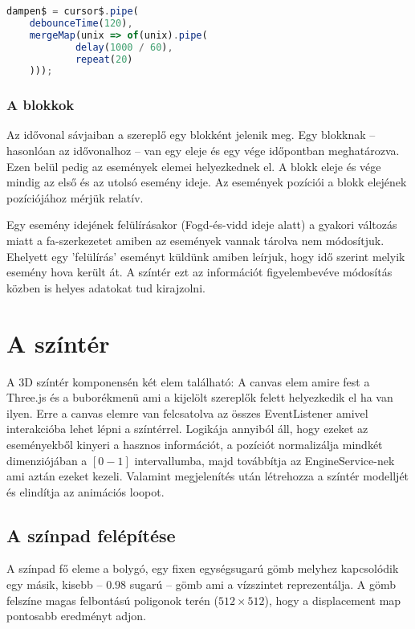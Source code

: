 \begin{lstlisting}[language={JavaScript}]
dampen$ = cursor$.pipe(
	debounceTime(120),
	mergeMap(unix => of(unix).pipe(
			delay(1000 / 60),
			repeat(20)
	)));
\end{lstlisting}

\subsubsection{A blokkok}

Az idővonal sávjaiban a szereplő egy blokként jelenik meg. Egy blokknak -- hasonlóan az idővonalhoz -- van egy eleje és egy vége időpontban meghatározva. Ezen belül pedig az események elemei helyezkednek el. A blokk eleje és vége mindig az első és az utolsó esemény ideje. Az események pozíciói a blokk elejének pozíciójához mérjük relatív.

Egy esemény idejének felülírásakor (Fogd-és-vidd ideje alatt) a gyakori változás miatt a fa-szerkezetet amiben az események vannak tárolva nem módosítjuk. Ehelyett egy 'felülírás' eseményt küldünk amiben leírjuk, hogy idő szerint melyik esemény hova került át. A színtér ezt az információt figyelembevéve módosítás közben is helyes adatokat tud kirajzolni.

\section{A színtér}

A 3D színtér komponensén két elem található: A canvas elem amire fest a Three.js és a buborékmenü ami a kijelölt szereplők felett helyezkedik el ha van ilyen. Erre a canvas elemre van felcsatolva az összes EventListener amivel interakcióba lehet lépni a színtérrel. Logikája annyiból áll, hogy ezeket az eseményekből kinyeri a hasznos információt, a pozíciót normalizálja mindkét dimenziójában a $[0-1]$ intervallumba, majd továbbítja az EngineService-nek ami aztán ezeket kezeli. Valamint megjelenítés után létrehozza a színtér modelljét és elindítja az animációs loopot.

\subsection{A színpad felépítése}

A színpad fő eleme a bolygó, egy fixen egységsugarú gömb melyhez kapcsolódik egy másik, kisebb -- $0.98$ sugarú -- gömb ami a vízszintet reprezentálja. A gömb felszíne magas felbontású poligonok terén ($512×512$), hogy a displacement map \cite{Displacement} pontosabb eredményt adjon.

